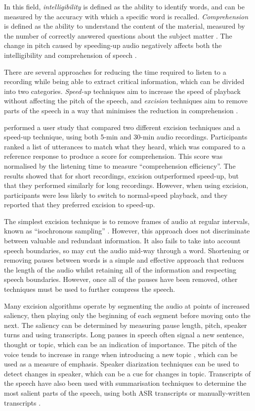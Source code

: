 In this field, \textit{intelligibility} is defined as the ability to identify words, and can be measured by the
accuracy with which a specific word is recalled. \textit{Comprehension} is defined as the ability to understand the
content of the material, measured by the number of correctly answered questions about the subject matter
\citep{Foulke1969}.  The change in pitch caused by speeding-up audio negatively affects both the intelligibility and
comprehension of speech \citep{Arons1997}.


There are several approaches for reducing the time required to listen to a recording while being able to extract
critical information, which can be divided into two categories. \textit{Speed-up} techniques aim to increase the speed
of playback without affecting the pitch of the speech, and \textit{excision} techniques aim to remove parts of the
speech in a way that minimises the reduction in comprehension \citep{Arons1997}.

\citet{Tucker2006} performed a user study that compared two different excision techniques and a speed-up technique,
using both 5-min and 30-min audio recordings.  Participants ranked a list of utterances to match what they heard, which
was compared to a reference response to produce a score for comprehension. This score was normalised by the listening
time to measure ``comprehension efficiency''.  The results showed that for short recordings, excision outperformed
speed-up, but that they performed similarly for long recordings. However, when using excision, participants were less
likely to switch to normal-speed playback, and they reported that they preferred excision to speed-up.



The simplest excision technique is to remove frames of audio at regular intervals, known as ``isochronous sampling''
\citep{Arons1997}.  However, this approach does not discriminate between valuable and redundant information. It also
fails to take into account speech boundaries, so may cut the audio mid-way through a word. Shortening or removing
pauses between words is a simple and effective approach that reduces the length of the audio whilst retaining all of
the information and respecting speech boundaries. However, once all of the pauses have been removed, other techniques
must be used to further compress the speech.


Many excision algorithms operate by segmenting the audio at points of increased saliency, then playing only the
beginning of each segment before moving onto the next. The saliency can be determined by measuring pause length, pitch,
speaker turns and using transcripts.  Long pauses in speech often signal a new sentence, thought or topic, which can be
an indication of importance. The pitch of the voice tends to increase in range when introducing a new topic
\citep{Hirschberg1992}, which can be used as a measure of emphasis.  Speaker diarization techniques
\citep{AngueraMiro2012} can be used to detect changes in speaker, which can be a cue for changes in topic. Transcripts
of the speech have also been used with summarisation techniques to determine the most salient parts of the speech,
using both ASR transcripts \citep{Hori2003} or manually-written transcripts \citep{Tucker2006}.

